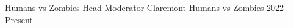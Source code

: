 

\begin{cvhonors}

  \cvhonor
    {Humans vs Zombies Head Moderator} %
    {Claremont Humans vs Zombies} %
    {} %
    {2022 - Present} %

\end{cvhonors}
